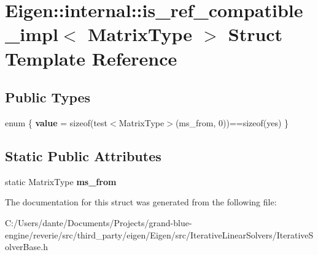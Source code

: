 \hypertarget{struct_eigen_1_1internal_1_1is__ref__compatible__impl}{}\section{Eigen\+::internal\+::is\+\_\+ref\+\_\+compatible\+\_\+impl$<$ Matrix\+Type $>$ Struct Template Reference}
\label{struct_eigen_1_1internal_1_1is__ref__compatible__impl}
\subsection*{Public Types}
\begin{DoxyCompactItemize}
\item 
\mbox{\label{struct_eigen_1_1internal_1_1is__ref__compatible__impl_a095e3ce366bd1a6e83605c4801eb13f2}} 
enum \{ {\bfseries value} = sizeof(test$<$Matrix\+Type$>$(ms\+\_\+from, 0))==sizeof(yes)
 \}
\end{DoxyCompactItemize}
\subsection*{Static Public Attributes}
\begin{DoxyCompactItemize}
\item 
\mbox{\label{struct_eigen_1_1internal_1_1is__ref__compatible__impl_ab99805bdac566d7649b75d64cdb9d35f}} 
static Matrix\+Type {\bfseries ms\+\_\+from}
\end{DoxyCompactItemize}


The documentation for this struct was generated from the following file\+:\begin{DoxyCompactItemize}
\item 
C\+:/\+Users/dante/\+Documents/\+Projects/grand-\/blue-\/engine/reverie/src/third\+\_\+party/eigen/\+Eigen/src/\+Iterative\+Linear\+Solvers/Iterative\+Solver\+Base.\+h\end{DoxyCompactItemize}
